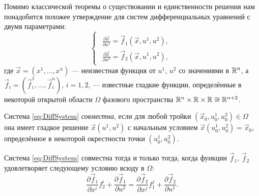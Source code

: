 Помимо классической теоремы о существовании и единственности решения нам понадобится похожее утверждение для систем дифференциальных уравнений с двумя параметрами:
\begin{equation} \label{eq:DiffSystem}
	\begin{cases}
		\begin{aligned}
			\frac{\partial\vec{x}}{\partial u^1} = \vec{f}_1(\vec{x}, u^1, u^2),\\
			\frac{\partial\vec{x}}{\partial u^2} = \vec{f}_2(\vec{x}, u^1, u^2),
		\end{aligned}
	\end{cases}
\end{equation}
где $\vec{x} = (x^1, \ldots, x^n)$ --- неизвестная функция от $u^1$, $u^2$ со значениями в $\mathbb{R}^n$, а $\vec{f}_i = (\vec{f}_i^1, \ldots, \vec{f}_i^n)$, $i = 1, 2$, --- известные гладкие функции, определённые в некоторой открытой области $\Omega$ фазового пространства $\mathbb{R}^n \times \mathbb{R} \times \mathbb{R} \cong \mathbb{R}^{n + 2}$.

\begin{definition}
	Система \eqref{eq:DiffSystem} \textit{совместна}, если для любой тройки $(\vec{x}_0, u^1_0, u^2_0) \in \Omega$ она имеет гладкое решение $\vec{x}(u^1, u^2)$ с начальным условием $\vec{x}(u^1_0, u^2_0) = \vec{x}_0$, определённое в некоторой окрестности точки $(u^1_0, u^2_0)$.
\end{definition}

\begin{theorem}[Дарбу] \label{theorem:Darboux}
	Система \eqref{eq:DiffSystem} совместна тогда и только тогда, когда функции $\vec{f}_1$, $\vec{f}_2$ удовлетворяет следующему условию всюду в $\Omega$:
	\begin{equation} \label{eq:Darboux}
		\frac{\partial \vec{f}_1}{\partial x^i}f^i_2 + \frac{\partial\vec{f}_1}{\partial u^2} = \frac{\partial\vec{f}_2}{\partial x^j}f^j_1 + \frac{\partial\vec{f}_2}{\partial u^1}.
	\end{equation}
\end{theorem}

